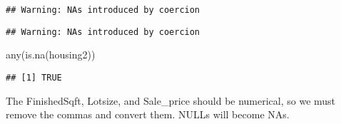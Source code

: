 \documentclass[
]{article}
\newenvironment{Shaded}{\begin{snugshade}}{\end{snugshade}}
\newcommand{\FunctionTok}[1]{\textcolor[rgb]{0.00,0.00,0.00}{#1}}
\newcommand{\NormalTok}[1]{#1}
\newcommand{\OtherTok}[1]{\textcolor[rgb]{0.56,0.35,0.01}{#1}}
\newcommand{\SpecialCharTok}[1]{\textcolor[rgb]{0.00,0.00,0.00}{#1}}
\newcommand{\StringTok}[1]{\textcolor[rgb]{0.31,0.60,0.02}{#1}}
\begin{document}
\begin{Shaded}
\end{Shaded}

\begin{verbatim}
## Warning: NAs introduced by coercion
\end{verbatim}

\begin{Shaded}
\end{Shaded}

\begin{verbatim}
## Warning: NAs introduced by coercion
\end{verbatim}

\begin{Shaded}
\begin{Highlighting}[]
\FunctionTok{any}\NormalTok{(}\FunctionTok{is.na}\NormalTok{(housing2))}
\end{Highlighting}
\end{Shaded}

\begin{verbatim}
## [1] TRUE
\end{verbatim}

The FinishedSqft, Lotsize, and Sale\_price should be numerical, so we
must remove the commas and convert them. NULLs will become NAs.

\begin{Shaded}
\end{Shaded}
\end{document}
